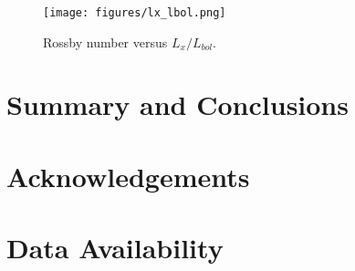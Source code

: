 \documentclass[twocolumn]{aastex631}
\begin{document}
\begin{figure}[ht!]
    \begin{centering}
        \texttt{[image: figures/lx\_lbol.png]}
        \caption{
         Rossby number versus $L_x/L_{bol}$.
        }
        \label{fig:lxlbol}
    \end{centering}
\end{figure}


\section{Summary and Conclusions}


\section{Acknowledgements}
\citep{lightkurvecollaboration2018lightkurve}

\section{Data Availability}



\end{document}
